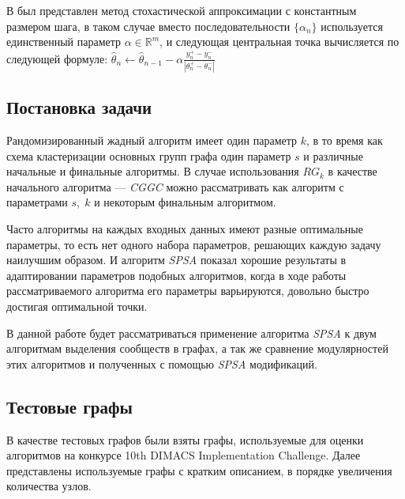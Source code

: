 В \cite{Granichin&Amelina:2015} был представлен метод стохастической аппроксимации с константным размером шага, в таком случае вместо последовательности $\{\alpha_n\}$ используется единственный параметр $\alpha \in \mathbb{R}^m$, и следующая центральная точка вычисляется по следующей формуле: $\hat{\theta}_n \leftarrow \hat{\theta}_{n - 1} - \alpha \frac{y_n^{+} - y_n^{-}}{|\theta_{n}^{+} - \theta_{n}^{-}|}$



\subsection{Постановка задачи}
\label{subsec:task}

Рандомизированный жадный алгоритм имеет один параметр $k$, в то время как схема кластеризации основных групп графа один параметр $s$ и различные начальные и финальные алгоритмы. В случае использования $RG_k$ в качестве начального алгоритма --- \emph{CGGC} можно рассматривать как алгоритм с параметрами $s,\;k$ и некоторым финальным алгоритмом.

Часто алгоритмы на каждых входных данных имеют разные оптимальные параметры, то есть нет одного набора параметров, решающих каждую задачу наилучшим образом. И алгоритм \emph{SPSA} показал хорошие результаты в адаптировании параметров подобных алгоритмов, когда в ходе работы рассматриваемого алгоритма его параметры варьируются, довольно быстро достигая оптимальной точки.

В данной работе будет рассматриваться применение алгоритма \emph{SPSA} к двум алгоритмам выделения сообществ в графах, а так же сравнение модулярностей этих алгоритмов и полученных с помощью \emph{SPSA} модификаций.



\subsection{Тестовые графы}

В качестве тестовых графов были взяты графы, используемые для оценки алгоритмов на конкурсе 10th DIMACS Implementation Challenge. Далее представлены используемые графы с кратким описанием, в порядке увеличения количества узлов.

